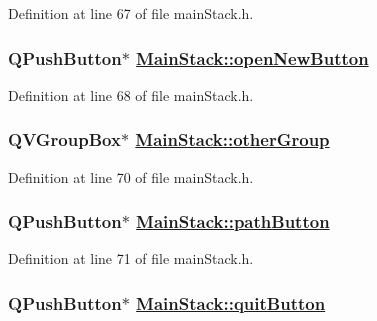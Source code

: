 Definition at line 67 of file main\-Stack.h.\hypertarget{classMainStack_r11}{
\subsubsection[openNewButton]{\setlength{\rightskip}{0pt plus 5cm}QPush\-Button$\ast$ \hyperlink{classMainStack_r11}{Main\-Stack::open\-New\-Button}}}
\label{classMainStack_r11}


Definition at line 68 of file main\-Stack.h.\hypertarget{classMainStack_r13}{
\subsubsection[otherGroup]{\setlength{\rightskip}{0pt plus 5cm}QVGroup\-Box$\ast$ \hyperlink{classMainStack_r13}{Main\-Stack::other\-Group}}}
\label{classMainStack_r13}


Definition at line 70 of file main\-Stack.h.\hypertarget{classMainStack_r14}{
\subsubsection[pathButton]{\setlength{\rightskip}{0pt plus 5cm}QPush\-Button$\ast$ \hyperlink{classMainStack_r14}{Main\-Stack::path\-Button}}}
\label{classMainStack_r14}


Definition at line 71 of file main\-Stack.h.\hypertarget{classMainStack_r16}{
\subsubsection[quitButton]{\setlength{\rightskip}{0pt plus 5cm}QPush\-Button$\ast$ \hyperlink{classMainStack_r16}{Main\-Stack::quit\-Button}}}
\label{classMainStack_r16}



